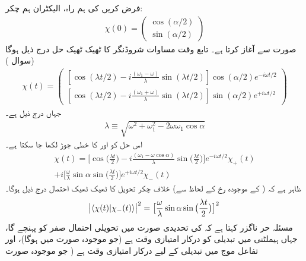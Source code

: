 فرض کریں  کی ہم راہ، الیکٹران ہم چکر:
\begin{align}
\chi (0) = 
\begin{pmatrix} 
\cos(\alpha/2) \\[0.5em]
\sin(\alpha/2)
\end{pmatrix}
\end{align}
 صورت سے آغاز کرتا ہے۔ تابع وقت مساوات شروڈنگر کا ٹھیک ٹھیک حل درج ذیل ہوگا (سوال )
\begin{align}\label{مساوات_حر_حل_مخصوص_ہیملٹنی}
\chi (t) = 
\begin{pmatrix}
[\cos(\lambda t/2) - i \frac{(\omega_1 - \omega)}{\lambda} \sin(\lambda t/2)] \cos(\alpha/2) e^{- i \omega t/2} \\[0.5em]
[\cos(\lambda t/2) - i \frac{(\omega_1 + \omega)}{\lambda} \sin(\lambda t/2)] \sin(\alpha/2) e^{+ i \omega t/2}
\end{pmatrix}
\end{align}
جہاں  درج ذیل ہے۔
\begin{align}
\lambda \equiv \sqrt{\omega^2 + \omega_1^2 - 2 \omega \omega_1 \cos \alpha}
\end{align}
اس حل کو  اور  کا خطی جوڑ لکھا جا سکتا ہے۔
\begin{multline}\label{مساوات_حر_حل_خطی_جوڑ}
\chi (t) = \big [ \cos\big ( \frac{\lambda t}{2} \big ) - i \frac{(\omega_1 - \omega \cos \alpha)}{\lambda} \sin\big ( \frac{\lambda t}{2} \big ) \big ] e^{- i \omega t/2} \chi_{+} (t) \\
+ i \big [ \frac{\omega}{\lambda} \sin \alpha \sin \big ( \frac{\lambda t}{2} \big ) \big ] e^{+ i \omega t/2} \chi_- (t)
\end{multline}
ظاہر ہے کہ ( کے موجودہ رخ کے لحاظ سے) خلاف چکر تحویل کا ٹھیک ٹھیک احتمال درج ذیل ہوگا۔ 
\begin{align}\label{مساوات_حر_تحویلی_احتمال}
\abs{\langle \chi (t) | \chi_{-} (t) \rangle}^2 = \big [ \frac{\omega}{\lambda} \sin \alpha \sin \big ( \frac{\lambda t}{2} \big ) \big ]^2
\end{align}
مسئلہ حر ناگزر کہتا ہے کہ  کی تحدیدی صورت میں تحویلی احتمال صفر کو پہنچے گا، جہاں ہیملٹنی میں تبدیلی کو درکار امتیازی وقت  ہے (جو موجودہ صورت میں  ہوگا)، اور تفاعل موج میں تبدیلی کے لیے درکار امتیازی وقت  ہے ( جو موجودہ صورت 
